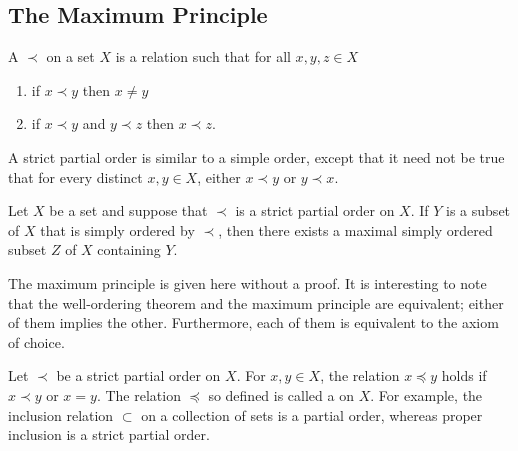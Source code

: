 \subsection{The Maximum Principle}
\label{app:maximum-principle}

A  $\prec$ on a set $X$ is a relation such that for all $x, y, z \in X$
\begin{enumerate}
\item if $x \prec y$ then $x \neq y$
\item if $x \prec y$ and $y \prec z$ then $x \prec z$.
\end{enumerate}

A strict partial order is similar to a simple order, except that it need not be true that for every distinct $x, y \in X$, either $x \prec y$ or $y \prec x$.

\begin{fact}
Let $X$ be a set and suppose that $\prec$ is a strict partial order on $X$.
If $Y$ is a subset of $X$ that is simply ordered by $\prec$, then there exists a maximal simply ordered subset $Z$ of $X$ containing $Y$.
\end{fact}

The maximum principle is given here without a proof.
It is interesting to note that the well-ordering theorem and the maximum principle are equivalent; either of them implies the other.
Furthermore, each of them is equivalent to the axiom of choice.

Let $\prec$ be a strict partial order on $X$.
For $x, y \in X$, the relation $x \preceq y$ holds if $x \prec y$ or $x = y$.
The relation $\preceq$ so defined is called a  on $X$.
For example, the inclusion relation $\subset$ on a collection of sets is a partial order, whereas proper inclusion is a strict partial order.

